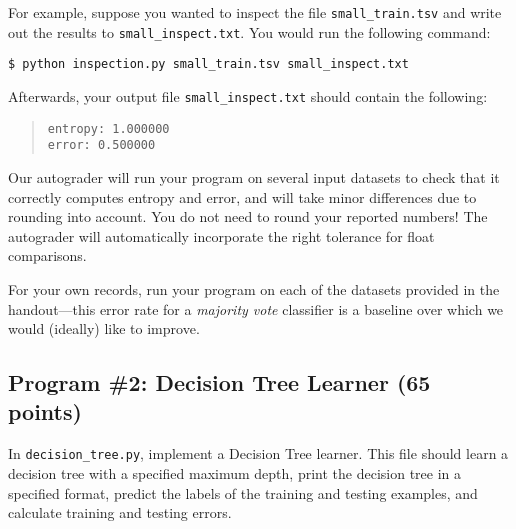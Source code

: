 \documentclass[11pt,addpoints,answers]{exam}
\begin{document}
For example, suppose you wanted to inspect the file \lstinline{small_train.tsv} and write out the results to \lstinline{small_inspect.txt}. You would run the following command:
%
\begin{lstlisting}[language=Shell]
$ python inspection.py small_train.tsv small_inspect.txt
\end{lstlisting}
%
Afterwards, your output file \lstinline{small_inspect.txt} should contain the following:
%
\begin{quote}
\begin{verbatim}
entropy: 1.000000
error: 0.500000
\end{verbatim}
\end{quote}
%
Our autograder will run your program on several input datasets to check that it correctly computes entropy and error, and will take minor differences due to rounding into account. You do not need to round your reported numbers! The autograder will automatically incorporate the right tolerance for float comparisons.

\begin{notebox}
For your own records, run your program on each of the datasets provided in the handout---this error rate for a \emph{majority vote} classifier is a baseline over which we would (ideally) like to improve.
\end{notebox}

\subsection{Program \#2: Decision Tree Learner (65 points)}
\label{sec:decisiontree}

In \texttt{decision\_tree.py}, implement a Decision Tree learner. This file should learn a decision tree with a specified maximum depth, print the decision tree in a specified format, predict the labels of the training and testing examples, and calculate training and testing errors.
\end{document}
